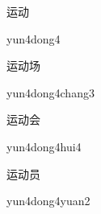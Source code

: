 \begin{verbete}{运动}
\begin{pronuncia}{yun4dong4}
\end{pronuncia}
\end{verbete}

\begin{verbete}{运动场}
\begin{pronuncia}{yun4dong4chang3}
\end{pronuncia}
\end{verbete}

\begin{verbete}{运动会}
\begin{pronuncia}{yun4dong4hui4}
\end{pronuncia}
\end{verbete}

\begin{verbete}{运动员}
\begin{pronuncia}{yun4dong4yuan2}
\end{pronuncia}
\end{verbete}

